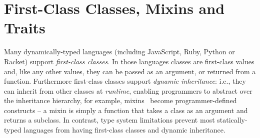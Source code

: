 

\section{First-Class Classes, Mixins and Traits}

Many dynamically-typed languages (including JavaScript, Ruby, Python or Racket)
support \emph{first-class classes}. In those languages classes are first-class
values and, like any other values, they can be passed as an argument, or
returned from a function. Furthermore first-class classes support \emph{dynamic
  inheritance}: i.e., they can inherit from other classes at \emph{runtime},
enabling programmers to abstract over the inheritance hierarchy, for example,
mixins~\citep{bracha1990mixin} become programmer-defined constructs -- a mixin is
simply a function that takes a class as an argument and returns a subclass. In
contrast, type system limitations prevent most statically-typed languages from
having first-class classes and dynamic inheritance.

